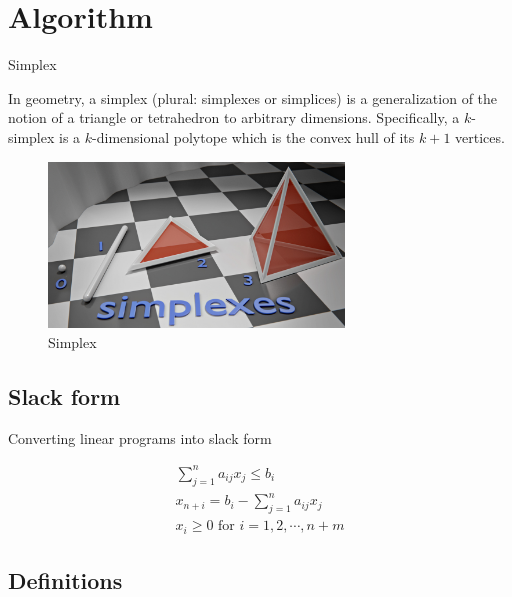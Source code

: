 \section{Algorithm}

\begin{frame}{Simplex}

    In geometry, a simplex (plural: simplexes or simplices) is a
    generalization of the notion of a triangle or tetrahedron to arbitrary dimensions.
    Specifically, a $k$-simplex is a $k$-dimensional polytope which is
    the convex hull of its $k + 1$ vertices.

    \begin{figure}
        \includegraphics[width=0.7\textwidth]{assets/simplex.png}
        \caption{Simplex}
    \end{figure}

\end{frame}

\subsection{Slack form}

\begin{frame}{Converting linear programs into slack form}

    \begin{gather*}
        \sum_{j=1}^{n}a_{ij}x_j \le b_i\\
        x_{n+i} = b_{i} - \sum_{j=1}^{n}a_{ij}x_j\\
        x_i\ge 0 \text{ for } i = 1,2,\cdots,n+m
    \end{gather*}

\end{frame}

\subsection{Definitions}

